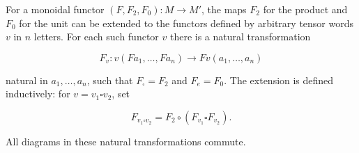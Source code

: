 For a monoidal functor $(F, F_2, F_0) : M \to M'$, the maps $F_2$ for the product and $F_0$ for the unit can be extended to the functors defined by arbitrary tensor words $v$ in $n$ letters. For each such functor $v$ there is a natural transformation

$$F_v : v(F a_1, \ldots, F a_n) \rightarrow F v(a_1, \ldots, a_n)$$

natural in $a_1, \ldots, a_n$, such that $F_\square = F_2$ and $F_e = F_0$. The extension is defined inductively: for $v = v_1 \square v_2$, set

$$F_{v_1 \square v_2} = F_2 \circ (F_{v_1} \square F_{v_2}).$$

All diagrams in these natural transformations commute.
